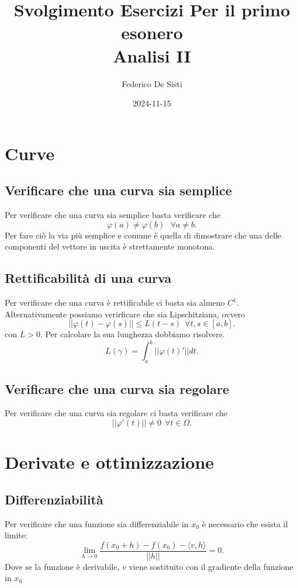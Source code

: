 \documentclass[12px]{article}
\title{Svolgimento Esercizi Per il primo esonero\\
Analisi II}
\date{2024-11-15}
\author{Federico De Sisti}
\begin{document}
	\maketitle
	\newpage
	\section{Curve}
	\subsection{Verificare che una curva sia semplice}
	Per verificare che una curva sia semplice basta verificare che
	 \[
	\varphi(a) \neq \varphi(b) \ \ \ \forall a\neq b
	.\] 
	Per fare ciò la via più semplice e comune è quella di dimostrare che una delle componenti del vettore in uscita è strettamente monotona.
	\subsection{Rettificabilità di una curva}
	Per verificare che una curva è rettificabile ci basta sia almeno $C^1$.
	Alternativamente possiamo verirficare che sia Lipschitziana, ovvero
	\[
		|| \varphi(t) - \varphi(s)|| \leq L(t-s) \ \ \forall t,s\in[a,b]
	.\]
con $L > 0$.
	Per calcolare la sua lunghezza dobbiamo risolvere.
	\[
	L( \gamma) = \int_a^b ||\varphi(t)'||dt
	.\] 
	\subsection{Verificare che una curva sia regolare}
	Per verificare che una curva sia regolare ci basta verificare che
	\[
	|| \varphi'(t)||\neq 0 \ \ \forall t\in \Omega
	.\] 
	\section{Derivate e ottimizzazione}
	\subsection{Differenziabilità}
	Per verificare che una funzione sia differenziabile in $x_0$ è necessario che esista il limite:
	\[
		\lim_{h \rightarrow 0}\frac{f(x_0 + h) - f(x_0) - \langle v, h \rangle }{||h||} = 0
	.\] 
	Dove se la funzione è derivabile,  $v$ viene sostituito con il gradiente della funzione in $x_0$
\end{document}
